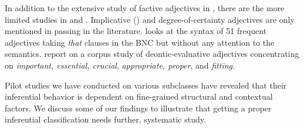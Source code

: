 \documentclass[10pt]{article}
\begin{document}
 
In addition to the extensive study of factive adjectives in \cite{norrick:1978},
there are the more limited studies in \cite{wilkinson:1970} and \cite{barker:2002}. Implicative (\cite{karttunen:1971}) and degree-of-certainty adjectives are only mentioned in passing in the literature. \cite{mindt:2011} looks at the syntax of 51 frequent adjectives taking \emph{that }clauses in the BNC but without any attention to the semantics. \cite{vanlinden+davidse:2009} report on a corpus study of deontic-evaluative adjectives concentrating on \emph{important, essential, crucial}, \emph{appropriate, proper}, and \emph{fitting}.


Pilot studies we have conducted on various subclasses have revealed  that their inferential behavior is dependent on fine-grained structural and contextual factors. We discuss some of our findings to illustrate that getting a proper inferential classification  needs further, systematic study.
\end{document}
